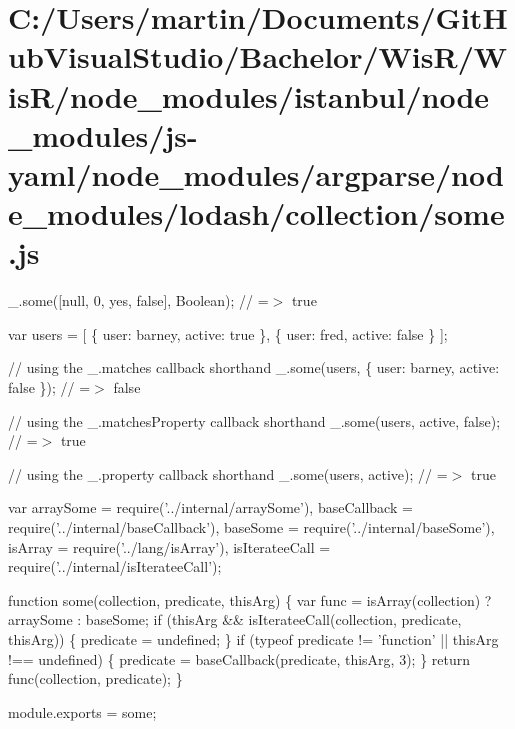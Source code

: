 \hypertarget{_c_1_2_users_2martin_2_documents_2_git_hub_visual_studio_2_bachelor_2_wis_r_2_wis_r_2node_module8e6549b27534111e78e3ebc6625f2b77}{}\section{C\+:/\+Users/martin/\+Documents/\+Git\+Hub\+Visual\+Studio/\+Bachelor/\+Wis\+R/\+Wis\+R/node\+\_\+modules/istanbul/node\+\_\+modules/js-\/yaml/node\+\_\+modules/argparse/node\+\_\+modules/lodash/collection/some.\+js}
\+\_\+.\+some(\mbox{[}null, 0, \textquotesingle{}yes\textquotesingle{}, false\mbox{]}, Boolean); // =$>$ true

var users = \mbox{[} \{ \textquotesingle{}user\textquotesingle{}\+: \textquotesingle{}barney\textquotesingle{}, \textquotesingle{}active\textquotesingle{}\+: true \}, \{ \textquotesingle{}user\textquotesingle{}\+: \textquotesingle{}fred\textquotesingle{}, \textquotesingle{}active\textquotesingle{}\+: false \} \mbox{]};

// using the {\ttfamily \+\_\+.\+matches} callback shorthand \+\_\+.\+some(users, \{ \textquotesingle{}user\textquotesingle{}\+: \textquotesingle{}barney\textquotesingle{}, \textquotesingle{}active\textquotesingle{}\+: false \}); // =$>$ false

// using the {\ttfamily \+\_\+.\+matches\+Property} callback shorthand \+\_\+.\+some(users, \textquotesingle{}active\textquotesingle{}, false); // =$>$ true

// using the {\ttfamily \+\_\+.\+property} callback shorthand \+\_\+.\+some(users, \textquotesingle{}active\textquotesingle{}); // =$>$ true


\begin{DoxyCodeInclude}
var arraySome = require(\textcolor{stringliteral}{'../internal/arraySome'}),
    baseCallback = require(\textcolor{stringliteral}{'../internal/baseCallback'}),
    baseSome = require(\textcolor{stringliteral}{'../internal/baseSome'}),
    isArray = require(\textcolor{stringliteral}{'../lang/isArray'}),
    isIterateeCall = require(\textcolor{stringliteral}{'../internal/isIterateeCall'});

\textcolor{keyword}{function} some(collection, predicate, thisArg) \{
  var func = isArray(collection) ? arraySome : baseSome;
  \textcolor{keywordflow}{if} (thisArg && isIterateeCall(collection, predicate, thisArg)) \{
    predicate = undefined;
  \}
  \textcolor{keywordflow}{if} (typeof predicate != \textcolor{stringliteral}{'function'} || thisArg !== undefined) \{
    predicate = baseCallback(predicate, thisArg, 3);
  \}
  \textcolor{keywordflow}{return} func(collection, predicate);
\}

module.exports = some;
\end{DoxyCodeInclude}
 